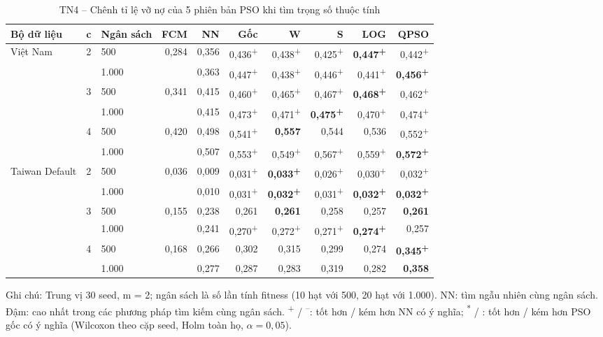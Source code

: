 \begin{table}[htbp]
\centering
\caption{TN4 -- Chênh tỉ lệ vỡ nợ của 5 phiên bản PSO khi tìm trọng số thuộc tính}
\label{tab:e9-chenh}
\footnotesize
\setlength{\tabcolsep}{3pt}
\begin{tabular}{@{}lllrrrrrrr@{}}
\toprule
Bộ dữ liệu & c & Ngân sách & FCM & NN & Gốc & W & S & LOG & QPSO \\
\midrule
Việt Nam & 2 & 500 & 0,284 & 0,356 & 0,436\textsuperscript{+} & 0,438\textsuperscript{+} & 0,425\textsuperscript{+} & \textbf{0,447\textsuperscript{+}} & 0,442\textsuperscript{+} \\
 &  & 1.000 &  & 0,363 & 0,447\textsuperscript{+} & 0,438\textsuperscript{+} & 0,446\textsuperscript{+} & 0,441\textsuperscript{+} & \textbf{0,456\textsuperscript{+}} \\
 & 3 & 500 & 0,341 & 0,415 & 0,460\textsuperscript{+} & 0,465\textsuperscript{+} & 0,467\textsuperscript{+} & \textbf{0,468\textsuperscript{+}} & 0,462\textsuperscript{+} \\
 &  & 1.000 &  & 0,415 & 0,473\textsuperscript{+} & 0,471\textsuperscript{+} & \textbf{0,475\textsuperscript{+}} & 0,470\textsuperscript{+} & 0,474\textsuperscript{+} \\
 & 4 & 500 & 0,420 & 0,498 & 0,541\textsuperscript{+} & \textbf{0,557} & 0,544 & 0,536 & 0,552\textsuperscript{+} \\
 &  & 1.000 &  & 0,507 & 0,553\textsuperscript{+} & 0,549\textsuperscript{+} & 0,567\textsuperscript{+} & 0,559\textsuperscript{+} & \textbf{0,572\textsuperscript{+}} \\
\midrule
Taiwan Default & 2 & 500 & 0,036 & 0,009 & 0,031\textsuperscript{+} & \textbf{0,033\textsuperscript{+}} & 0,026\textsuperscript{+} & 0,030\textsuperscript{+} & 0,032\textsuperscript{+} \\
 &  & 1.000 &  & 0,010 & 0,031\textsuperscript{+} & \textbf{0,032\textsuperscript{+}} & 0,031\textsuperscript{+} & \textbf{0,032\textsuperscript{+}} & \textbf{0,032\textsuperscript{+}} \\
 & 3 & 500 & 0,155 & 0,238 & 0,261 & \textbf{0,261} & 0,258 & 0,257 & \textbf{0,261} \\
 &  & 1.000 &  & 0,241 & 0,270\textsuperscript{+} & 0,272\textsuperscript{+} & 0,271\textsuperscript{+} & \textbf{0,274\textsuperscript{+}} & 0,257 \\
 & 4 & 500 & 0,168 & 0,266 & 0,302 & 0,315 & 0,299 & 0,274 & \textbf{0,345\textsuperscript{+}} \\
 &  & 1.000 &  & 0,277 & 0,287 & 0,283 & 0,319 & 0,282 & \textbf{0,358} \\
\bottomrule
\end{tabular}
\par\smallskip\parbox{\linewidth}{\scriptsize Ghi chú: Trung vị 30 seed, m = 2; ngân sách là số lần tính fitness (10 hạt với 500, 20 hạt với 1.000). NN: tìm ngẫu nhiên cùng ngân sách. Đậm: cao nhất trong các phương pháp tìm kiếm cùng ngân sách. \textsuperscript{+} / \textsuperscript{--}: tốt hơn / kém hơn NN có ý nghĩa; \textsuperscript{*} / \textsuperscript{\dag}: tốt hơn / kém hơn PSO gốc có ý nghĩa (Wilcoxon theo cặp seed, Holm toàn họ, $\alpha = 0{,}05$).}
\end{table}
